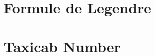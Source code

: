 \renewcommand{\proofname}{{\rm \small PREUVE}}

\section{Formule de Legendre}\label{annex:1.05}


\section{Taxicab Number}\label{annex:1.29}

%
%
%
% 